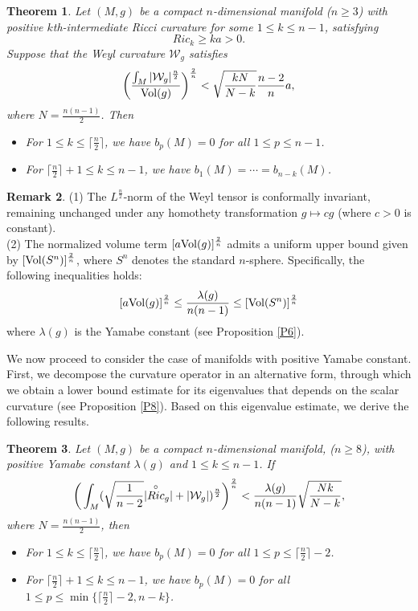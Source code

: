 \documentclass[12pt, twoside]{article}
\newtheorem{theorem}{Theorem}[section]
\theoremstyle{definition}
\newtheorem{remark}[theorem]{Remark}
\numberwithin{equation}{section}
\def \la {\lambda}
\begin{document}
\begin{theorem}\label{T6}
Let $(M,g)$ be a compact $n$-dimensional manifold ($n \geq 3$) with positive $k$th-intermediate Ricci curvature for some $1 \leq k \leq n-1$, satisfying
	$$Ric_{k}\geq ka>0.$$ 
	Suppose that the Weyl curvature $\mathcal{W}_{g}$ satisfies
$$\bigg{(}\frac{\int_{M}|\mathcal{W}_{g}|^{\frac{n}{2}}}{{\rm{Vol}}(g)}\bigg{)}^{\frac{2}{n}}<\sqrt{\frac{kN}{N-k}}\frac{n-2}{n}a,$$	
where $N=\frac{n(n-1)}{2}$. Then
	\begin{itemize}
		\item[(1)] For $1\leq k\leq \lceil\frac{n}{2}\rceil$, we have $b_{p}(M)=0$ for all $1\leq p\leq n-1$.
	\item[(2)] For $ \lceil\frac{n}{2}\rceil+1\leq k\leq n-1$, we have
	$b_{1}(M)=\cdots=b_{n-k}(M)$.
\end{itemize}
\end{theorem}
\begin{remark}(1)	The $L^{\frac{n}{2}}$-norm of the Weyl tensor is conformally invariant, remaining unchanged under any homothety transformation $g \mapsto cg$ (where $c > 0$ is constant).\\
(2) The normalized volume term $[a{\rm{Vol}}(g)]^{\frac{2}{n} }$ admits a uniform upper bound given by $[{\rm{Vol}}(S^{n})]^{\frac{2}{n}}$, where $S^{n}$ denotes the standard $n$-sphere. Specifically, the following  inequalities holds:
$$[a{\rm{Vol}}(g)]^{\frac{2}{n} }\leq \frac{\la(g) }{n(n-1)}\leq[{\rm{Vol}}(S^{n})]^{\frac{2}{n}}$$
where $\la(g)$ is the Yamabe constant (see Proposition \ref{P6}).
\end{remark}
We now proceed to consider the case of manifolds with positive Yamabe constant. First, we decompose the curvature operator in an alternative form, through which we obtain a lower bound estimate for its eigenvalues that depends on the scalar curvature (see Proposition \ref{P8}). Based on this eigenvalue estimate, we derive the following results.
\begin{theorem}\label{T11}
	Let $(M,g)$ be a compact $n$-dimensional manifold, ($n \geq 8$), with positive Yamabe constant $\la(g)$ and $ 1\leq k\leq n-1$. If 
	$$ \bigg{(}\int_{M}(\sqrt{\frac{ 1}{n-2}}|\overset{\circ}{Ric}_{g}|+|\mathcal{W}_{g}|)^{ \frac{n}{2} }\bigg{)}^{\frac{2}{n} }<\frac{\la(g)}{n(n-1)}\sqrt{\frac{Nk}{N-k} },$$
	where $N=\frac{n(n-1)}{2}$, then 
		\begin{itemize}
		\item[(1)] For $1\leq k\leq \lceil\frac{n}{2}\rceil$, we have $b_{p}(M)=0$ for all $1\leq p\leq \lceil\frac{n}{2}\rceil-2$.
		\item[(2)] For $ \lceil\frac{n}{2}\rceil+1\leq k\leq n-1$, we have
		$b_{p}(M)=0$ for all $1\leq p\leq \min\{\lceil\frac{n}{2}\rceil-2,n-k \}$.
	\end{itemize}
\end{theorem}
\end{document}
